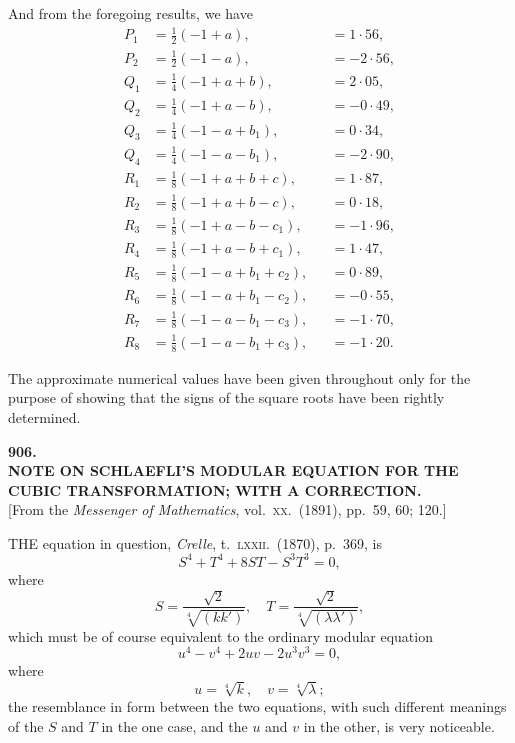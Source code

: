 \documentclass[11pt,a4paper]{article}
\begin{document}
And from the foregoing results, we have
\begin{align*}
P_1 &= \tfrac{1}{2}(- 1 + a), & &= 1{\cdot}56,\\
P_2 &= \tfrac{1}{2}(- 1 - a), & &= - 2{\cdot}56,\\
Q_1 &= \tfrac{1}{4}(- 1 + a + b), & &= 2{\cdot}05,\\
Q_2 &= \tfrac{1}{4}(- 1 + a - b), & &= - 0{\cdot}49,\\
Q_3 &= \tfrac{1}{4}(- 1 - a + b_1), & &= 0{\cdot}34,\\
Q_4 &= \tfrac{1}{4}(- 1 - a - b_1), & &= - 2{\cdot}90,\\
R_1 &= \tfrac{1}{8}(- 1 + a + b + c), & &= 1{\cdot}87,\\
R_2 &= \tfrac{1}{8}(- 1 + a + b - c), & &= 0{\cdot}18,\\
R_3 &= \tfrac{1}{8}(- 1 + a - b - c_1), & &= - 1{\cdot}96,\\
R_4 &= \tfrac{1}{8}(- 1 + a - b + c_1), & &= 1{\cdot}47,\\
R_5 &= \tfrac{1}{8}(- 1 - a + b_1 + c_2), & &= 0{\cdot}89,\\
R_6 &= \tfrac{1}{8}(- 1 - a + b_1 - c_2), & &= - 0{\cdot}55,\\
R_7 &= \tfrac{1}{8}(- 1 - a - b_1 - c_3), & &= - 1{\cdot}70,\\
R_8 &= \tfrac{1}{8}(- 1 - a - b_1 + c_3), & &= - 1{\cdot}20.
\end{align*}

The approximate numerical values have been given throughout only for the purpose of showing that the signs of the square roots have been rightly determined.

\clearpage

\begin{center}
{\large\bfseries 906.}\\[0.5em]
{\large\bfseries NOTE ON SCHLAEFLI'S MODULAR EQUATION FOR THE\\ CUBIC TRANSFORMATION; WITH A CORRECTION.}\\[0.5em]
\small [From the \emph{Messenger of Mathematics}, vol.\ \textsc{xx}.\ (1891), pp.\ 59, 60; 120.]
\end{center}
\medskip

\noindent THE equation in question, \emph{Crelle}, t.\ \textsc{lxxii}.\ (1870), p.\ 369, is
\[
S^4 + T^4 + 8 S T - S^3 T^3 = 0,
\]
where
\[
S = \frac{\sqrt{2}}{\sqrt[4]{(k k')}},\quad T = \frac{\sqrt{2}}{\sqrt[4]{(\lambda \lambda')}},
\]
which must be of course equivalent to the ordinary modular equation
\[
u^4 - v^4 + 2 u v - 2 u^3 v^3 = 0,
\]
where
\[
u = \sqrt[4]{k},\quad v = \sqrt[4]{\lambda};
\]
the resemblance in form between the two equations, with such different meanings of the $S$ and $T$ in the one case, and the $u$ and $v$ in the other, is very noticeable.
\end{document}
